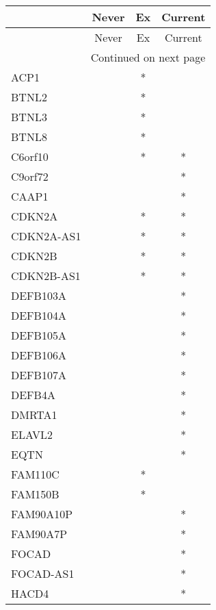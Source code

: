 \begin{longtable}{lccc}
\toprule
{} & Never & Ex & Current \\
\midrule
\endfirsthead

\toprule
{} & Never & Ex & Current \\
\midrule
\endhead
\midrule
\multicolumn{4}{r}{{Continued on next page}} \\
\midrule
\endfoot

\bottomrule
\endlastfoot
ACP1         &       &  * &         \\
BTNL2        &       &  * &         \\
BTNL3        &       &  * &         \\
BTNL8        &       &  * &         \\
C6orf10      &       &  * &       * \\
C9orf72      &       &    &       * \\
CAAP1        &       &    &       * \\
CDKN2A       &       &  * &       * \\
CDKN2A-AS1   &       &  * &       * \\
CDKN2B       &       &  * &       * \\
CDKN2B-AS1   &       &  * &       * \\
DEFB103A     &       &    &       * \\
DEFB104A     &       &    &       * \\
DEFB105A     &       &    &       * \\
DEFB106A     &       &    &       * \\
DEFB107A     &       &    &       * \\
DEFB4A       &       &    &       * \\
DMRTA1       &       &    &       * \\
ELAVL2       &       &    &       * \\
EQTN         &       &    &       * \\
FAM110C      &       &  * &         \\
FAM150B      &       &  * &         \\
FAM90A10P    &       &    &       * \\
FAM90A7P     &       &    &       * \\
FOCAD        &       &    &       * \\
FOCAD-AS1    &       &    &       * \\
HACD4        &       &    &       * \\

\end{longtable}
